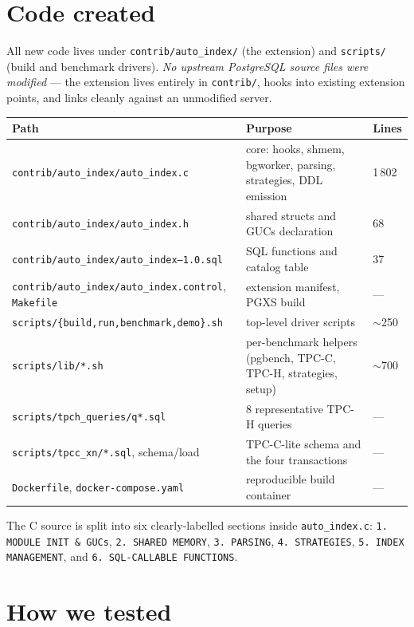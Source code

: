 \documentclass[10pt,a4paper]{article}
\newcommand{\code}[1]{\texttt{\small #1}}
\begin{document}
\section{Code created}

All new code lives under \code{contrib/auto\_index/} (the extension)
and \code{scripts/} (build and benchmark drivers). \emph{No upstream
PostgreSQL source files were modified} --- the extension lives
entirely in \code{contrib/}, hooks into existing extension points, and
links cleanly against an unmodified server.

\begin{center}\small
\begin{tabular}{lll}
\toprule
\textbf{Path} & \textbf{Purpose} & \textbf{Lines} \\
\midrule
\code{contrib/auto\_index/auto\_index.c}        & core: hooks, shmem, bgworker, parsing, strategies, DDL emission & 1\,802 \\
\code{contrib/auto\_index/auto\_index.h}        & shared structs and GUCs declaration & 68 \\
\code{contrib/auto\_index/auto\_index--1.0.sql} & SQL functions and catalog table & 37 \\
\code{contrib/auto\_index/auto\_index.control}, \code{Makefile} & extension manifest, PGXS build & --- \\
\code{scripts/\{build,run,benchmark,demo\}.sh}  & top-level driver scripts & $\sim$250 \\
\code{scripts/lib/*.sh}                         & per-benchmark helpers (pgbench, TPC-C, TPC-H, strategies, setup) & $\sim$700 \\
\code{scripts/tpch\_queries/q*.sql}             & 8 representative TPC-H queries & --- \\
\code{scripts/tpcc\_xn/*.sql}, schema/load      & TPC-C-lite schema and the four transactions & --- \\
\code{Dockerfile}, \code{docker-compose.yaml}   & reproducible build container & --- \\
\bottomrule
\end{tabular}
\end{center}

The C source is split into six clearly-labelled sections inside
\code{auto\_index.c}: \code{1.\,MODULE INIT \& GUCs},
\code{2.\,SHARED MEMORY}, \code{3.\,PARSING}, \code{4.\,STRATEGIES},
\code{5.\,INDEX MANAGEMENT}, and \code{6.\,SQL-CALLABLE FUNCTIONS}.

\section{How we tested}
\end{document}
